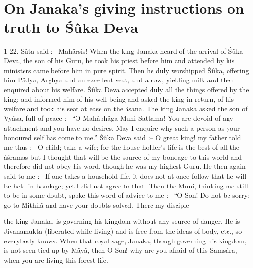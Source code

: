 \chapter{On Janaka’s giving instructions on truth to \'S\^uka Deva}

1-22. S\^uta said :-- Mah\^arsis! When the king Janaka heard of the arrival of \'S\^uka Deva, the son of his Guru, he took his priest before him and attended by his ministers came before him in pure spirit. Then he duly worshipped \'S\^uka, offering him P\^adya, Arghya and an excellent seat, and a cow, yielding milk and then enquired about his welfare. \'S\^uka Deva accepted duly all the things offered by the king; and informed him of his well-being and asked the king in return, of his welfare and took his seat at ease on the \^asana. The king Janaka asked the son of Vy\^asa, full of peace :-- ``O Mah\^abh\^aga Muni Sattama! You are devoid of any attachment and you have no desires. May I enquire why such a person as your honoured self has come to me.'' \'S\^uka Deva said :-- O great king! my father told me thus :-- O child; take a wife; for the house-holder's life is the best of all the \^a\'sramas but I thought that will be the source of my bondage to this world and therefore did not obey his word, though he was my highest Guru. He then again said to me :-- If one takes a household life, it does not at once follow that he will be held in bondage; yet I did not agree to that. Then the Muni, thinking me still to be in some doubt, spoke this word of advice to me :-- ``O Son! Do not be sorry; go to Mithil\^a and have your doubts solved. There my disciple

the king Janaka, is governing his kingdom without any source of danger. He is Jivanamukta (liberated while living) and is free from the ideas of body, etc., so everybody knows. When that royal sage, Janaka, though governing his kingdom, is not seen tied up by M\^ay\^a, then O Son! why are you afraid of this Sams\^ara, when you are living this forest life.

